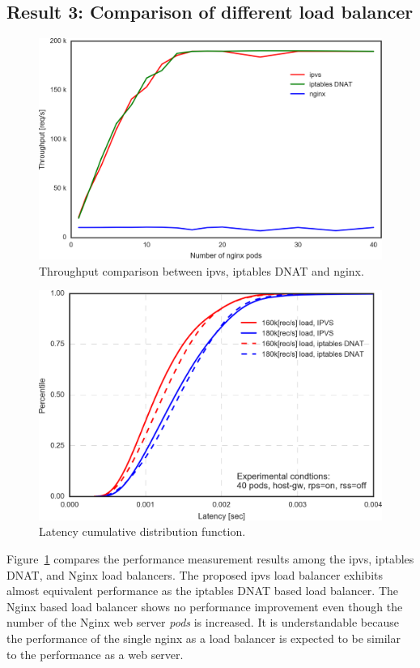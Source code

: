 \FloatBarrier

\subsection{Result 3: Comparison of different load balancer}

\begin{figure}[htb]
  \centering
  \includegraphics[width=0.8\columnwidth]{Figs/ipvs-iptables-nginx}
  \caption{Throughput comparison between ipvs, iptables DNAT and nginx.}
  \label{fig:ipvs-iptables-nginx}
\end{figure}

\begin{figure}[htb]
  \centering
  \includegraphics[width=0.8\columnwidth]{Figs/latency_cdf_rps_40pods}
  \caption{Latency cumulative distribution function.}
  \label{fig:latency_cdf_rps_40pods}
\end{figure}

Figure~\ref{fig:ipvs-iptables-nginx} compares the performance measurement results among the ipvs, iptables DNAT, and Nginx load balancers.
The proposed ipvs load balancer exhibits almost equivalent performance as the iptables DNAT based load balancer. 
The Nginx based load balancer shows no performance improvement even though the number of the Nginx web server {\em pods} is increased.
It is understandable because the performance of the single nginx as a load balancer is expected to be similar to the performance as a web server.

